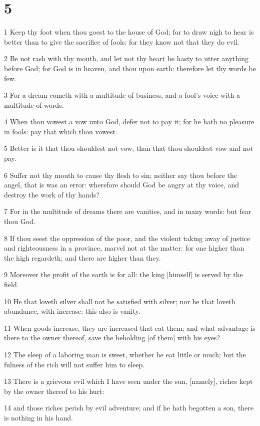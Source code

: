 \chapter{5}

\par 1 Keep thy foot when thou goest to the house of God; for to draw nigh to hear is better than to give the sacrifice of fools: for they know not that they do evil.
\par 2 Be not rash with thy mouth, and let not thy heart be hasty to utter anything before God; for God is in heaven, and thou upon earth: therefore let thy words be few.
\par 3 For a dream cometh with a multitude of business, and a fool's voice with a multitude of words.
\par 4 When thou vowest a vow unto God, defer not to pay it; for he hath no pleasure in fools: pay that which thou vowest.
\par 5 Better is it that thou shouldest not vow, than that thou shouldest vow and not pay.
\par 6 Suffer not thy mouth to cause thy flesh to sin; neither say thou before the angel, that is was an error: wherefore should God be angry at thy voice, and destroy the work of thy hands?
\par 7 For in the multitude of dreams there are vanities, and in many words: but fear thou God.
\par 8 If thou seest the oppression of the poor, and the violent taking away of justice and righteousness in a province, marvel not at the matter: for one higher than the high regardeth; and there are higher than they.
\par 9 Moreover the profit of the earth is for all: the king [himself] is served by the field.
\par 10 He that loveth silver shall not be satisfied with silver; nor he that loveth abundance, with increase: this also is vanity.
\par 11 When goods increase, they are increased that eat them; and what advantage is there to the owner thereof, save the beholding [of them] with his eyes?
\par 12 The sleep of a laboring man is sweet, whether he eat little or much; but the fulness of the rich will not suffer him to sleep.
\par 13 There is a grievous evil which I have seen under the sun, [namely], riches kept by the owner thereof to his hurt:
\par 14 and those riches perish by evil adventure; and if he hath begotten a son, there is nothing in his hand.

